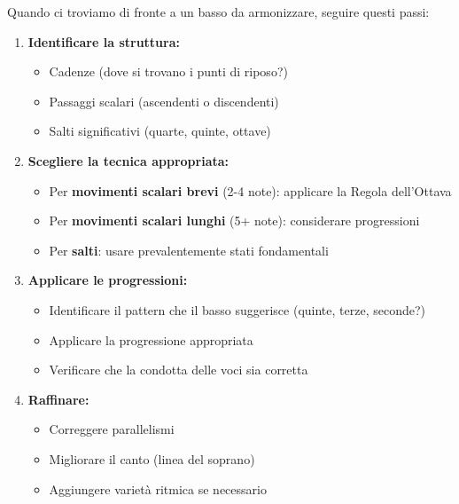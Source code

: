 \begin{regola}
	\label{reg:strategia-armonizzazione}
	Quando ci troviamo di fronte a un basso da armonizzare, seguire questi passi:
	
	\begin{enumerate}
		\item \textbf{Identificare la struttura:}
		\begin{itemize}
			\item Cadenze (dove si trovano i punti di riposo?)
			\item Passaggi scalari (ascendenti o discendenti)
			\item Salti significativi (quarte, quinte, ottave)
		\end{itemize}
		
		\item \textbf{Scegliere la tecnica appropriata:}
		\begin{itemize}
			\item Per \textbf{movimenti scalari brevi} (2-4 note): applicare la Regola dell'Ottava
			\item Per \textbf{movimenti scalari lunghi} (5+ note): considerare progressioni
			\item Per \textbf{salti}: usare prevalentemente stati fondamentali
		\end{itemize}
		
		\item \textbf{Applicare le progressioni:}
		\begin{itemize}
			\item Identificare il pattern che il basso suggerisce (quinte, terze, seconde?)
			\item Applicare la progressione appropriata
			\item Verificare che la condotta delle voci sia corretta
		\end{itemize}
		
		\item \textbf{Raffinare:}
		\begin{itemize}
			\item Correggere parallelismi
			\item Migliorare il canto (linea del soprano)
			\item Aggiungere varietà ritmica se necessario
		\end{itemize}
	\end{enumerate}
\end{regola}

